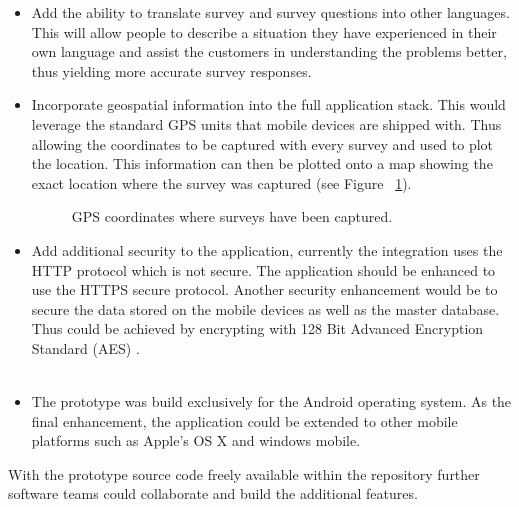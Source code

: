 \documentclass[12pt]{witseiepaper}
\begin{document}
\begin{itemize}
\item Add the ability to translate survey and survey questions into other languages. This will allow people to describe a situation they have experienced in their own language and assist the customers in understanding the problems better, thus yielding more accurate survey responses.
\\
\item Incorporate geospatial information into the full application stack. This would leverage the standard GPS units that mobile devices are shipped with. Thus allowing the coordinates to be captured with every survey and used to plot the location. This information can then be plotted onto a map showing the exact location where the survey was captured (see Figure ~\ref{fig:gps}). 

\begin{figure}[H]
	\caption{GPS coordinates where surveys have been captured.} 
	\label{fig:gps}
\end{figure}

\item Add additional security to the application, currently the integration uses the HTTP protocol which is not secure. The application should be enhanced to use the HTTPS secure protocol. Another security enhancement would be to secure the data stored on the mobile devices as well as the master database. Thus could be achieved by encrypting with 128 Bit Advanced Encryption Standard (AES) \cite{AES}. \\ \\

\item The prototype was build exclusively for the Android operating system. As the final enhancement, the application could be extended to other mobile platforms such as Apple's OS X and windows mobile.
\end{itemize}

With the prototype source code freely available within the repository further software teams could collaborate and build the additional features.
\end{document}
